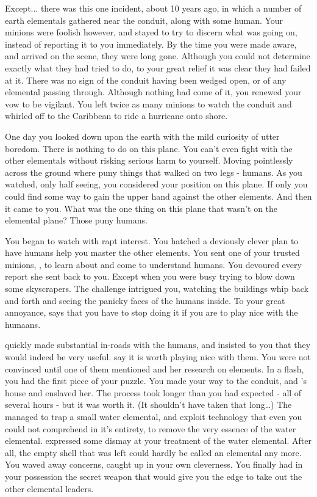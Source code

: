 \documentclass[char]{elementals}
\begin{document}
Except... there was this one incident, about 10 years ago, in which a number of earth elementals gathered near the conduit, along with some human. Your minions were foolish however, and stayed to try to discern what was going on, instead of reporting it to you immediately. By the time you were made aware, and arrived on the scene, they were long gone. Although you could not determine exactly  what they had tried to do, to your great relief it was clear they had failed at it. There was no sign of the conduit having been wedged open, or of any elemental passing through. Although nothing had come of it, you renewed your vow to be vigilant. You left twice as many minions to watch the conduit and whirled off to the Caribbean to ride a hurricane onto shore.

One day you looked down upon the earth with the mild curiosity of utter boredom. There is nothing to do on this plane. You can't even fight with the other elementals without risking serious harm to yourself. Moving pointlessly across the ground where puny things that walked on two legs - humans. As you watched, only half seeing, you considered your position on this plane. If only you could find some way to gain the upper hand against the other elements. And then it came to you. What was the one thing on this plane that wasn't on the elemental plane? Those puny humans.

You began to watch with rapt interest. You hatched a deviously clever plan to have humans help you master the other elements. You sent one of your trusted minions, \cNaturalist{\intro}, to learn about and come to understand humans. You devoured every report she sent back to you. Except when you were busy trying to blow down some skyscrapers. The challenge intrigued you, watching the buildings whip back and forth and seeing the panicky faces of the humans inside. To your great annoyance, \cNaturalist{} says that you have to stop doing it if you are to play nice with the humaans.

\cNaturalist{} quickly made substantial in-roads with the humans, and insisted to you that they would indeed be very useful. \cNaturalist{\They} say it is worth playing nice with them. You were not convinced until one of them mentioned \cGD{\intro} and her research on elements. In a flash, you had the first piece of your puzzle. You made your way to the conduit, and \cGD{}'s house and enslaved her. The process took longer than you had expected - all of several hours - but it was worth it. (It shouldn't have taken that long{\ldots}) The \cGD{\kid} managed to trap a small water elemental, and exploit technology that even you could not comprehend in it's entirety, to remove the very essence of the water elemental. \cNaturalist{\MYname{}} expressed some dismay at your treatment of the water elemental. After all, the empty shell that was left could hardly be called an elemental any more. You waved away \cNaturalist{\their} concerns, caught up in your own cleverness. You finally had in your possession the secret weapon that would give you the edge to take out the other elemental leaders.
\end{document}
